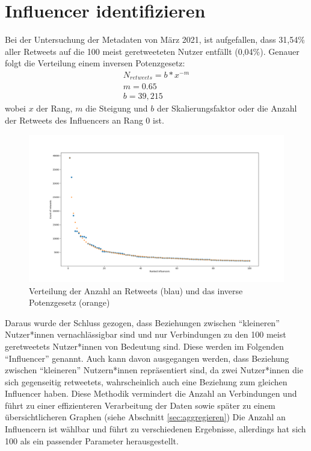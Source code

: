 \section{Influencer identifizieren}
\label{sec:influencer}
Bei der Untersuchung der Metadaten von März 2021, ist aufgefallen, dass 31,54\% aller \glspl{Retweet} auf die 100 meist geretweeteten Nutzer entfällt (0,04\%).
Genauer folgt die Verteilung einem inversen Potenzgesetz:
\begin{equation}
	\begin{aligned}
		N_{retweets} = b*x^{-m}\\
		m = 0.65\\
		b = 39,215
	\end{aligned}
\end{equation}
wobei $x$ der Rang, $m$ die Steigung und $b$ der Skalierungsfaktor oder die Anzahl der Retweets des Influencers an Rang 0 ist.\\
\begin{figure}[h!]
	\centering
	\includegraphics[width=0.8\linewidth]{images/power-law}
	\caption{Verteilung der Anzahl an \glspl{Retweet} (blau) und das inverse Potenzgesetz (orange)}
	\label{fig:tweetverteilung}
\end{figure}
Daraus wurde der Schluss gezogen, dass Beziehungen zwischen "`kleineren"' Nutzer*innen vernachlässigbar sind und nur Verbindungen zu den 100 meist \glspl{geretweetet} Nutzer*innen von Bedeutung sind. Diese werden im Folgenden "`Influencer"' genannt. Auch kann davon ausgegangen werden, dass Beziehung zwischen "`kleineren"' Nutzern*innen  repräsentiert sind, da zwei Nutzer*innen die sich gegenseitig \glspl{retweetet}, wahrscheinlich auch eine Beziehung zum gleichen Influencer haben. 
Diese Methodik vermindert die Anzahl an Verbindungen und führt zu einer effizienteren Verarbeitung der Daten sowie später zu einem übersichtlicheren Graphen (siehe Abschnitt \ref{sec:aggregieren})
Die Anzahl an Influencern ist wählbar und führt zu verschiedenen Ergebnisse, allerdings hat sich 100 als ein passender Parameter herausgestellt. 


